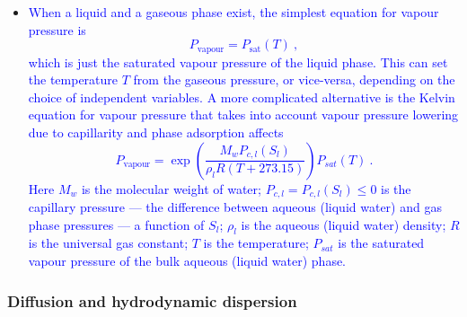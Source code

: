 \documentclass[12pt]{report}
\begin{document}
\begin{itemize}
\item \textcolor{blue}{When a liquid and a gaseous phase exist, the
  simplest equation for vapour pressure is
\begin{equation}
P_{\mathrm{vapour}} = P_{\mathrm{sat}}(T) \ ,
\end{equation}
which is just the saturated vapour pressure of the liquid phase.  This
can set the temperature $T$ from the gaseous pressure, or vice-versa,
depending on the choice of independent variables.  A more complicated
alternative is the Kelvin equation for vapour pressure that takes into
account vapour pressure lowering due to capillarity and phase
adsorption affects
\begin{equation}
P_{\mathrm{vapour}} = \exp\left( \frac{M_{w}P_{c,l}(S_{l})}{\rho_{l}R(T+273.15)} \right)
P_{sat}(T) \ .
\label{vap.p.eqn}
\end{equation}
Here $M_{w}$ is the molecular weight of water; $P_{c,l}=
P_{c,l}(S_{l})\leq 0$ is the capillary pressure --- the difference
between aqueous (liquid water) and gas phase pressures --- a function
of $S_{l}$; $\rho_{l}$ is the aqueous (liquid water) density; $R$ is
the universal gas constant; $T$ is the temperature; $P_{sat}$ is the
saturated vapour pressure of the bulk aqueous (liquid water) phase.}
\end{itemize}


\subsubsection{Diffusion and hydrodynamic dispersion}
\end{document}
